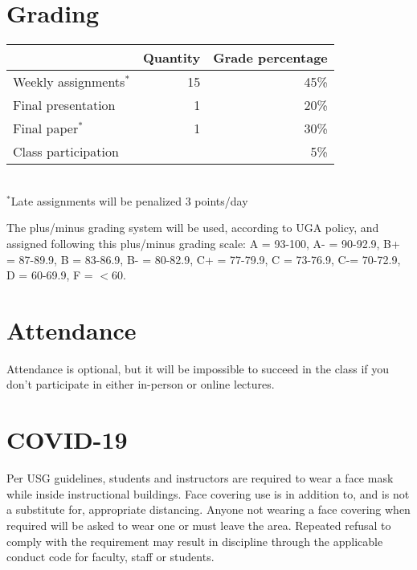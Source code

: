 \documentclass[12pt]{article}
\begin{document}
  

\vspace{-2mm}
\section*{\normalsize Grading}
\vspace{-4mm}
\begin{center}
  \begin{tabular}[h!]{lrr}
    \hline
                           & Quantity & Grade percentage         \\
    \hline
    Weekly assignments$^*$ & 15       & 45\%                     \\
    Final presentation     & 1        & 20\%                     \\
    Final paper$^{*}$      & 1        & 30\%                     \\
    Class participation    &          & 5\%                      \\
    \hline
  \end{tabular}                                                  \\
  \small
\hspace{0mm} $^*$Late assignments will be penalized 3 points/day \\ 
\end{center}
The plus/minus grading system will be used, according to UGA policy,
and assigned following this plus/minus grading scale: A = 93-100, A- =
90-92.9, B+ = 87-89.9, B = 83-86.9, B- = 80-82.9, C+ = 77-79.9, C =
73-76.9, C-= 70-72.9, D = 60-69.9, F = $<$60. 


\vspace{-2mm}
\section*{\normalsize Attendance}
\vspace{-4mm}
Attendance is optional, but it will be impossible to succeed in the
class if you don't participate in either in-person or online
lectures. 

\vspace{-2mm}
\section*{\normalsize COVID-19}
\vspace{-4mm}
Per USG guidelines, students and instructors are required to wear a
face mask while inside instructional buildings. Face covering use is
in addition to, and is not a substitute for, appropriate
distancing. Anyone not wearing a face covering when required will be
asked to wear one or must leave the area. Repeated refusal to comply
with the requirement may result in discipline through the applicable
conduct code for faculty, staff or students.
\end{document}
